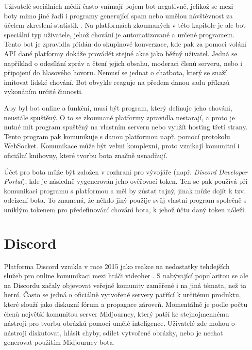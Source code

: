 \documentclass[FM]{tulthesis}
\begin{document}
	Uživatelé sociálních médií často vnímají pojem bot negativně, jelikož se mezi boty mimo jiné řadí i programy generující spam nebo umělou návštěvnost za účelem zkreslení statistik \cite{lit_Discord}. Na platformách zkoumaných v této kapitole je ale bot speciální typ uživatele, jehož chování je automatizované a určené programem. Tento bot je zpravidla přidán do skupinové konverzace, kde pak za pomoci volání API dané platformy dokáže provádět stejné akce jako běžný uživatel. Jedná se například o odesílání zpráv a čtení jejich obsahu, moderaci členů serveru, nebo i připojení do hlasového hovoru. Nemusí se jednat o chatbota, který se snaží imitovat lidské chování. Bot obvykle reaguje na předem danou sadu příkazů vykonáním určité činnosti.
		
	Aby byl bot online a funkční, musí být program, který definuje jeho chování, neustále spuštěný. O to se zkoumané platformy zpravidla nestarají, a proto je nutné mít program spuštěný na vlastním serveru nebo využít hosting třetí strany. Tento program pak komunikuje s danou platformou např. pomocí protokolu \mbox{WebSocket}. Komunikace může být velmi komplexní, proto vznikají komunitní i oficiální knihovny, které tvorbu bota značně usnadňují.
	
	Účet pro bota může být založen v rozhraní pro vývojáře (např. \textit{Discord Developer Portal}), kde je následně vygenerován jeho ověřovací token. Ten se pak používá při komunikaci programu s platformou a měl by zůstat tajný, jinak může dojít k tzv. odcizení bota. To znamená, že někdo jiný použije svůj vlastní program společně s uniklým tokenem pro předefinování chování bota, k jehož účtu daný token náleží.
	
	\section{Discord}
	
	Platforma Discord vznikla v roce 2015 jako reakce na nedostatky tehdejších služeb pro online komunikaci mezi hráči videoher \cite{lit_Discord}. S nabývající popularitou se ale na Discordu začaly objevovat veřejné komunity zaměřené i na jiná témata, než ta herní. Často se jedná o oficiálně vytvořené servery patřící k určitému produktu, které slouží jako diskuzní fórum a propagace zároveň. Momentálně je podle počtu členů největší komunitou server Midjourney, který patří ke stejnojmennému nástroji pro tvorbu obrázků pomocí umělé inteligence. Uživatelé zde mohou o nástroji diskutovat, hlásit chyby, sdílet vytvořené obrázky, nebo je nechat generovat použitím Midjourney bota.
	
\end{document}
